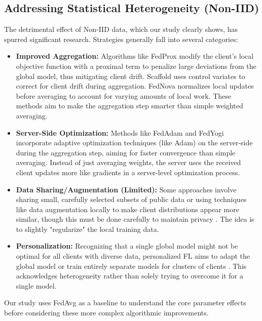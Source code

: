 \documentclass[conference]{IEEEtran}
\begin{document}
\subsection{Addressing Statistical Heterogeneity (Non-IID)}
The detrimental effect of Non-IID data, which our study clearly shows, has spurred significant research. Strategies generally fall into several categories:
\begin{itemize}
    \item \textbf{Improved Aggregation:} Algorithms like FedProx \cite{b8} modify the client's local objective function with a proximal term to penalize large deviations from the global model, thus mitigating client drift. Scaffold \cite{b7} uses control variates to correct for client drift during aggregation. FedNova \cite{b19} normalizes local updates before averaging to account for varying amounts of local work. These methods aim to make the aggregation step smarter than simple weighted averaging.
    \item \textbf{Server-Side Optimization:} Methods like FedAdam \cite{b9} and FedYogi \cite{b10} incorporate adaptive optimization techniques (like Adam) on the server-side during the aggregation step, aiming for faster convergence than simple averaging. Instead of just averaging weights, the server uses the received client updates more like gradients in a server-level optimization process.
    \item \textbf{Data Sharing/Augmentation (Limited):} Some approaches involve sharing small, carefully selected subsets of public data or using techniques like data augmentation locally to make client distributions appear more similar, though this must be done carefully to maintain privacy \cite{b20}. The idea is to slightly "regularize" the local training data.
    \item \textbf{Personalization:} Recognizing that a single global model might not be optimal for all clients with diverse data, personalized FL aims to adapt the global model or train entirely separate models for clusters of clients \cite{b16}. This acknowledges heterogeneity rather than solely trying to overcome it for a single model.
\end{itemize}
Our study uses FedAvg as a baseline to understand the core parameter effects before considering these more complex algorithmic improvements.
\end{document}

